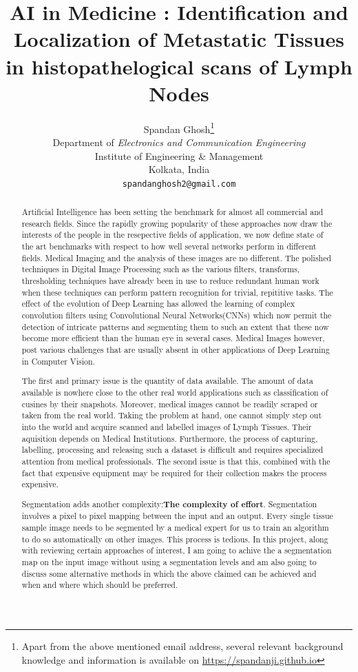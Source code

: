 \documentclass[19pt]{article}
\title{AI in Medicine : Identification and Localization of Metastatic Tissues in histopathelogical scans of Lymph Nodes}
\author{
    Spandan Ghosh\thanks{Apart from the above mentioned email address, several relevant background knowledge and information is available on \url{https://spandanji.github.io}}\\
    Department of \emph{Electronics and Communication Engineering}\\
  Institute of Engineering \& Management\\
  Kolkata, India \\
  \texttt{spandanghosh2@gmail.com} \\
}
\begin{document}
\maketitle

\begin{abstract}
    Artificial Intelligence has been setting the benchmark for almost all commercial and research fields. Since the rapidly growing popularity of these approaches now draw the interests of the people in the resepective fields of application, we now define state of the art benchmarks with respect to how well several networks perform in different fields. Medical Imaging and the analysis of these images are no different. The polished techniques in Digital Image Processing such as the various filters, transforms, thresholding techniques have already been in use to reduce redundant human work when these techniques can perform pattern recognition for trivial, repititive tasks. The effect of the evolution of Deep Learning has allowed the learning of complex convolution filters using Convolutional Neural Networks(CNNs) which now permit the detection of intricate patterns and segmenting them to such an extent that these now become more efficient than the human eye in several cases. Medical Images however, post various challenges that are usually absent in other applications of Deep Learning in Computer Vision. 

    The first and primary issue is the quantity of data available. The amount of data available is nowhere close to the other real world applications such as classification of cusines by their snapshots. Moreover, medical images cannot be readily scraped or taken from the real world. Taking the problem at hand, one cannot simply step out into the world and acquire scanned and labelled images of Lymph Tissues. Their aquisition depends on Medical Institutions. Furthermore, the process of capturing, labelling, processing and releasing such a dataset is difficult and requires specialized attention from medical professionals. The second issue is that this, combined with the fact that expensive equipment may be required for their collection makes the process expensive.

    Segmentation adds another complexity:\textbf{The complexity of effort}. Segmentation involves a pixel to pixel mapping between the input and an output. Every single tissue sample image needs to be segmented by a medical expert for us to train an algorithm to do so automatically on other images. This process is tedious. In this project, along with reviewing certain approaches of interest, I am going to achive the a segmentation map on the input image without using a segmentation levels and am also going to discuss some alternative methods in which the above claimed can be achieved and when and where which should be preferred.
    
\end{abstract}
\newpage
    \tableofcontents
\newpage
\end{document}
